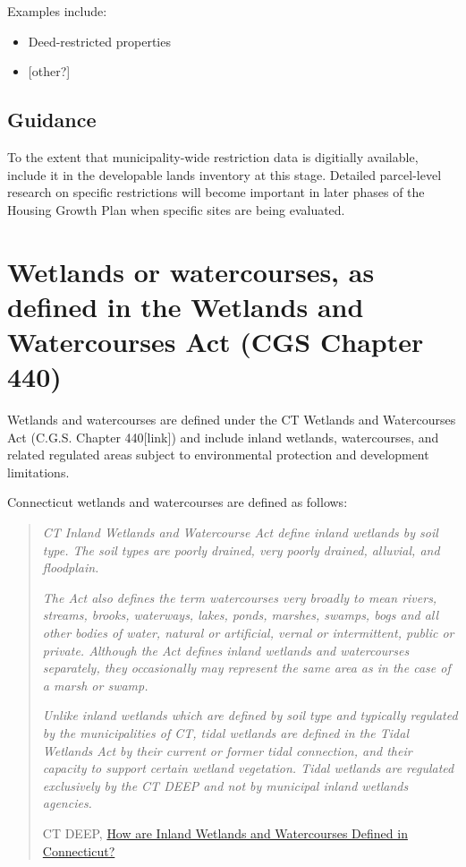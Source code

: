 \documentclass[
  letterpaper,
  DIV=11,
  numbers=noendperiod]{scrreprt}
\providecommand{\tightlist}{%
  \setlength{\itemsep}{0pt}\setlength{\parskip}{0pt}}
\begin{document}
Examples include:

\begin{itemize}
\tightlist
\item
  Deed-restricted properties
\item
  {[}other?{]}
\end{itemize}

\subsection{Guidance}\label{guidance}

To the extent that municipality-wide restriction data is digitially
available, include it in the developable lands inventory at this stage.
Detailed parcel-level research on specific restrictions will become
important in later phases of the Housing Growth Plan when specific sites
are being evaluated.

\section{Wetlands or watercourses, as defined in the Wetlands and
Watercourses Act (CGS Chapter
440)}\label{wetlands-or-watercourses-as-defined-in-the-wetlands-and-watercourses-act-cgs-chapter-440}

Wetlands and watercourses are defined under the CT Wetlands and
Watercourses Act (C.G.S. Chapter 440{[}link{]}) and include inland
wetlands, watercourses, and related regulated areas subject to
environmental protection and development limitations.

Connecticut wetlands and watercourses are defined as follows:

\begin{quote}
\emph{CT Inland Wetlands and Watercourse Act define inland wetlands by
soil type. The soil types are poorly drained, very poorly drained,
alluvial, and floodplain.}

\emph{The Act also defines the term watercourses very broadly to mean
rivers, streams, brooks, waterways, lakes, ponds, marshes, swamps, bogs
and all other bodies of water, natural or artificial, vernal or
intermittent, public or private. Although the Act defines inland
wetlands and watercourses separately, they occasionally may represent
the same area as in the case of a marsh or swamp.}

\emph{Unlike inland wetlands which are defined by soil type and
typically regulated by the municipalities of CT, tidal wetlands are
defined in the Tidal Wetlands Act by their current or former tidal
connection, and their capacity to support certain wetland vegetation.
Tidal wetlands are regulated exclusively by the CT DEEP and not by
municipal inland wetlands agencies.}

CT DEEP,
\href{https://portal.ct.gov/DEEP/Water/Inland-Wetlands/How-Are-Inland--Wetlands-and-Watercourses--Defined}{How
are Inland Wetlands and Watercourses Defined in Connecticut?}
\end{quote}
\end{document}
